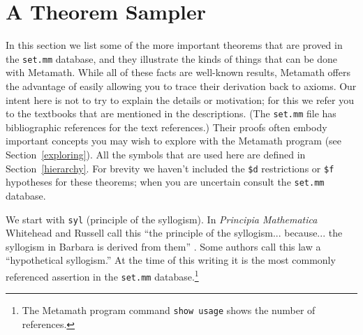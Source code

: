 
\section{A Theorem Sampler}\label{sometheorems}

In this section we list some of the more important theorems that are proved in
the \texttt{set.mm} database, and they illustrate the kinds of things that can be
done with Metamath.  While all of these facts are well-known results,
Metamath offers the advantage of easily allowing you to trace their
derivation back to axioms.  Our intent here is not to try to explain the
details or motivation; for this we refer you to the textbooks that are
mentioned in the descriptions.  (The \texttt{set.mm} file has bibliographic
references for the text references.)  Their proofs often embody important
concepts you may wish to explore with the Metamath program (see
Section~\ref{exploring}).  All the symbols that are used here are defined in
Section~\ref{hierarchy}.  For brevity we haven't included the \texttt{\$d}
restrictions or \texttt{\$f} hypotheses for these theorems; when you are
uncertain consult the \texttt{set.mm} database.

We start with \texttt{syl} (principle of the syllogism).
In \textit{Principia Mathematica}
Whitehead and Russell call this ``the principle of the
syllogism... because... the syllogism in Barbara is derived from them''
\cite[quote after Theorem *2.06 p.~101]{PM}.
Some authors call this law a ``hypothetical syllogism.''
At the time of this writing it is the most commonly referenced assertion in the
\texttt{set.mm} database.\footnote{
The Metamath program command \texttt{show usage}
shows the number of references.
}

